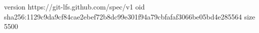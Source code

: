 version https://git-lfs.github.com/spec/v1
oid sha256:1129c9da9cf84cae2ebef72b8dc99e301f94a79cbfafaf3066be05bd4e285564
size 5500
